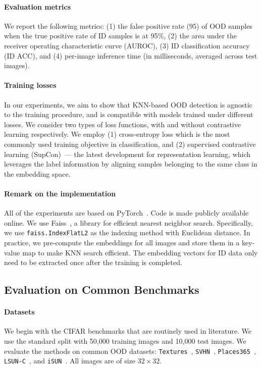 \documentclass[nohyperref]{article}
\theoremstyle{plain}
\theoremstyle{definition}
\theoremstyle{remark}
\begin{document}
\vspace{-0.3cm}
\paragraph{Evaluation metrics} 
We report the following metrics: (1) the false positive rate (95) of OOD samples when the true positive rate of ID samples is at 95\%, (2) the area under the receiver operating characteristic curve (AUROC), (3) ID classification accuracy (ID ACC), and (4) per-image inference time (in milliseconds, averaged across test images).

\vspace{-0.3cm}
\paragraph{Training losses} In our experiments, we aim to show that KNN-based OOD detection is agnostic to the training procedure, and is compatible with models trained under different losses. We consider two types of loss functions, with and without contrastive learning respectively. We employ (1) cross-entropy loss which is the most commonly used training objective in classification, and (2) supervised contrastive learning (SupCon)~\citep{2020supcon}--- the latest development for representation learning, which leverages the label information by aligning samples belonging to the same class in the embedding space. 

\vspace{-0.3cm}
\paragraph{Remark on the implementation} 
All of the experiments are
based on PyTorch~\citep{pytorch}. Code is made publicly available online. We use Faiss~\citep{faiss}, a library for efficient nearest neighbor search. Specifically, we use \texttt{faiss.IndexFlatL2} as the indexing method with Euclidean distance. In practice, we pre-compute the embeddings for all images and store
them in a key-value map to make KNN search efficient. The embedding vectors for ID data only need to be extracted once after the training is completed. 

\subsection{Evaluation on Common Benchmarks}
\label{sec:common_benchmark}


\paragraph{Datasets}
We begin with the CIFAR benchmarks that are routinely used in literature. We use the standard split with 50,000 training images and 10,000 test images. We evaluate the methods on common OOD datasets: \texttt{Textures}~\citep{cimpoi2014describing}, \texttt{SVHN}~\citep{netzer2011reading}, \texttt{Places365}~\citep{zhou2017places}, \texttt{LSUN-C}~\citep{yu2015lsun}, and \texttt{iSUN}~\citep{xu2015turkergaze}. All images are of size $32\times 32$.
\end{document}

